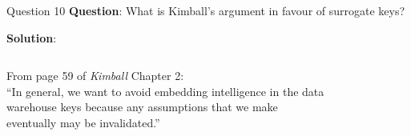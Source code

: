\begin{frame}[fragile]{Question 10}
	\textbf{Question}: What is Kimball's argument in favour of surrogate keys?\\\vspace{10pt}
	
	\textbf{Solution}: \\\vspace{5pt}
	\begin{columns}[t,onlytextwidth]
		From page 59 of \textit{Kimball} Chapter 2: \\\vspace{5pt}
		``In general, we want to avoid embedding intelligence in the data warehouse keys because any assumptions that we make eventually may be invalidated.''
		\begin{figure}
			\vspace{-15pt}
		\end{figure}
	\end{columns}
\end{frame}

